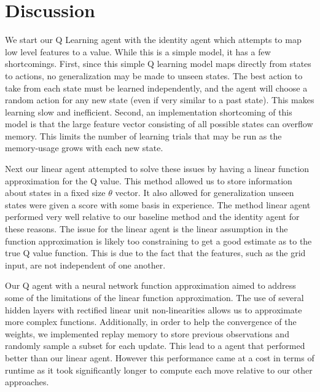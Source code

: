 \documentclass[12pt]{article}
\begin{document}
\section{Discussion}

We start our Q Learning agent with the identity agent which attempts to map low level features to a value. While this is a simple model, it has a few shortcomings. First, since this simple Q learning model maps directly from states to actions, no generalization may be made to unseen states. The best action to take from each state must be learned independently, and the agent will choose a random action for any new state (even if very similar to a past state). This makes learning slow and inefficient. Second, an implementation shortcoming of this model is that the large feature vector consisting of all possible states can overflow memory. This limits the number of learning trials that may be run as the memory-usage grows with each new state.

Next our linear agent attempted to solve these issues by having a linear function approximation for the Q value. This method allowed us to store information about states in a fixed size $\theta$ vector. It also allowed for generalization unseen states were given a score with some basis in experience. The method linear agent performed very well relative to our baseline method and the identity agent for these reasons. The issue for the linear agent is the linear assumption in the function approximation is likely too constraining to get a good estimate as to the true Q value function. This is due to the fact that the features, such as the grid input, are not independent of one another.

Our Q agent with a neural network function approximation aimed to address some of the limitations of the linear function approximation. The use of several hidden layers with rectified linear unit non-linearities allows us to approximate more complex functions. Additionally, in order to help the convergence of the weights, we implemented replay memory to store previous observations and randomly sample a subset for each update. This lead to a agent that performed better than our linear agent. However this performance came at a cost in terms of runtime as it took significantly longer to compute each move relative to our other approaches.





\printbibliography
\end{document}
